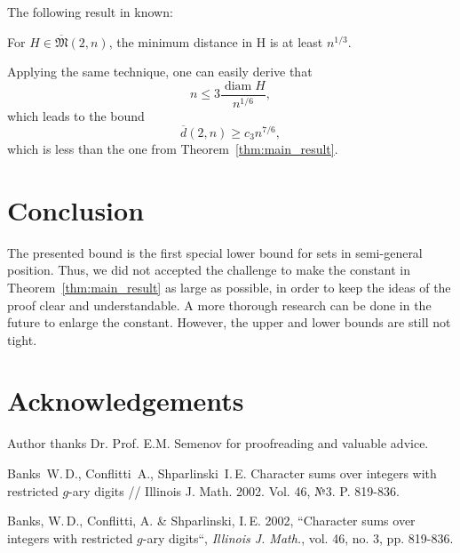 \documentclass[11pt,twoside,draft
]{article}
\theoremstyle{plain}
\begin{document}
\begin{remark}
	The following result in known:
\end{remark}

\begin{lemma}
	\cite[Corollary 1]{solymosi2003note}
	For $H \in \overline {\mathfrak{M}}(2,n)$, the minimum
	distance in H is at least $n^{1/3}$.
\end{lemma}
Applying the same technique, one can easily derive that
\begin{equation}
	n \leq 3 \frac{\operatorname{diam} H }{n^{1/6}}
	,
\end{equation}
which leads to the bound
\begin{equation}
	\overline{d}(2,n) \geq c_3 n^{7/6}
	,
\end{equation}
which is less than the one from Theorem~\ref{thm:main_result}.


\section{Conclusion}
The presented bound is the first special lower bound for sets in semi-general position.
Thus, we did not accepted the challenge to make the constant in Theorem~\ref{thm:main_result} as large as possible,
in order to keep the ideas of the proof clear and understandable.
A more thorough research can be done in the future to enlarge the constant.
However, the upper and lower bounds are still not tight.

\section{Acknowledgements}
Author thanks Dr. Prof. E.M. Semenov for proofreading and valuable advice.


\printbibliography


\begin{thebibliography}{99}

	Banks~W.\,D., Conflitti~A., Shparlinski~I.\,E. Character sums over integers with restricted $g$-ary digits // Illinois J. Math. 2002. Vol. 46, №3. P. 819-836.


\end{thebibliography}


\begin{engbibliography}{99}

	Banks, W.\,D., Conflitti, A. \& Shparlinski, I.\,E. 2002, ``Character sums over integers with restricted $g$-ary digits``, \textit{Illinois J. Math.}, vol. 46, no. 3, pp. 819-836.

\end{engbibliography}

\label{end}
\end{document}
